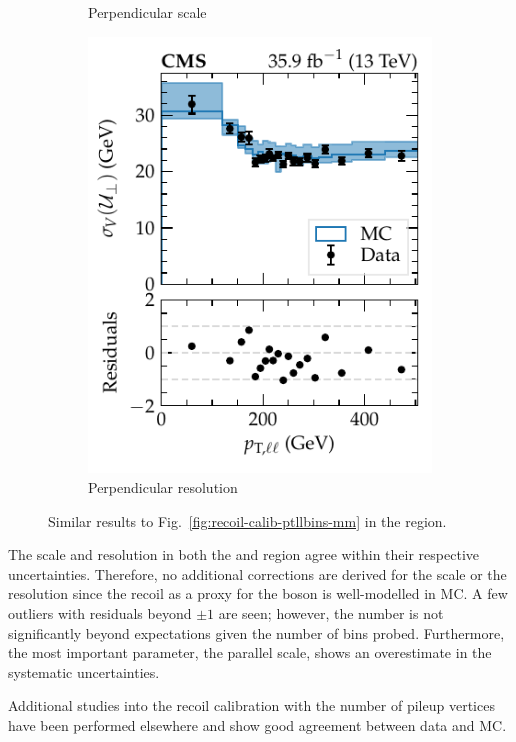\begin{figure}[htb]
\begin{subfigure}[b]{0.49\textwidth}
        \caption{Perpendicular scale}
        \label{subfigc:recoil-calib-ptllbins-ee}
    \end{subfigure}
    \hfill
    \begin{subfigure}[b]{0.49\textwidth}
        \centering
        \includegraphics{chapters/041_corrections/images/ptmiss_calib/metres_ee_sigmav_perp.pdf}
        \caption{Perpendicular resolution}
        \label{subfigd:recoil-calib-ptllbins-ee}
    \end{subfigure}
    \caption[Recoil scale and resolution in the dielectron final state.]{
        Similar results to Fig.~\ref{fig:recoil-calib-ptllbins-mm} in the \dieleplusjets region.
    }
    \label{fig:recoil-calib-ptllbins-ee}
\end{figure}
%
The scale and resolution in both the \dimuplusjets and \dieleplusjets region agree within their respective uncertainties. Therefore, no additional corrections are derived for the scale or the resolution since the recoil as a proxy for the boson \pt is well-modelled in MC. A few outliers with residuals beyond $\pm 1$ are seen; however, the number is not significantly beyond expectations given the number of bins probed. Furthermore, the most important parameter, the parallel scale, shows an overestimate in the systematic uncertainties.

Additional studies into the recoil calibration with the number of pileup vertices have been performed elsewhere \cite{Sirunyan:2019kia} and show good agreement between data and MC.

